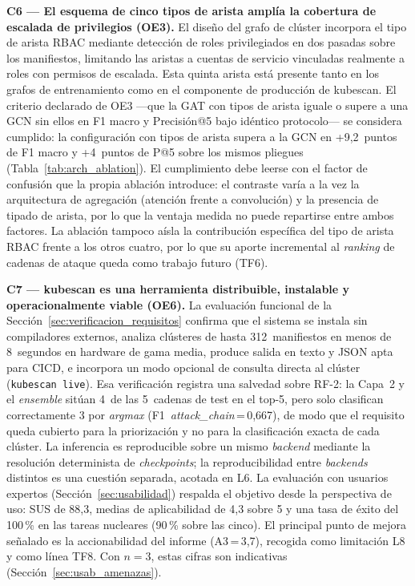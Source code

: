 \textbf{C6 — El esquema de cinco tipos de arista amplía la cobertura de escalada de
privilegios (OE3).} El diseño del grafo de clúster incorpora el tipo de arista
\ac{RBAC} mediante detección de roles privilegiados en dos pasadas sobre los
manifiestos, limitando las aristas a cuentas de servicio vinculadas realmente a
roles con permisos de escalada. Esta quinta arista está presente tanto en los
grafos de entrenamiento como en el componente de producción de kubescan.
El criterio declarado de OE3 —que la \ac{GAT} con tipos de arista iguale o supere a
una \ac{GCN} sin ellos en F1 macro y Precisión@5 bajo idéntico protocolo— se
considera cumplido: la configuración con tipos de arista supera a la \ac{GCN} en
+9,2~puntos de F1 macro y +4~puntos de P@5 sobre los mismos pliegues
(Tabla~\ref{tab:arch_ablation}). El cumplimiento debe leerse con el factor de confusión que
la propia ablación introduce: el contraste varía a la vez la arquitectura de
agregación (atención frente a convolución) y la presencia de tipado de arista, por
lo que la ventaja medida no puede repartirse entre ambos factores. La ablación
tampoco aísla la contribución específica del tipo de arista \ac{RBAC} frente a los
otros cuatro, por lo que su aporte incremental al \textit{ranking} de cadenas de ataque
queda como trabajo futuro (TF6).

\textbf{C7 — kubescan es una herramienta distribuible, instalable y operacionalmente
viable (OE6).} La evaluación funcional de la
Sección~\ref{sec:verificacion_requisitos} confirma que el sistema se instala sin
compiladores externos, analiza clústeres de hasta 312~manifiestos en menos de
8~segundos en hardware de gama media, produce salida en texto y \ac{JSON} apta para
\ac{CICD}, e incorpora un modo opcional de consulta directa al clúster
(\texttt{kubescan live}). Esa verificación registra una salvedad sobre RF-2: la
Capa~2 y el \textit{ensemble} sitúan 4~de las 5~cadenas de test en el top-5, pero
solo clasifican correctamente 3 por \textit{argmax}
(F1~\textit{attack\_chain}\,=\,0,667), de modo que el requisito queda cubierto para
la priorización y no para la clasificación exacta de cada clúster. La inferencia es
reproducible sobre un mismo \textit{backend} mediante la resolución determinista de
\textit{checkpoints}; la reproducibilidad entre \textit{backends} distintos es una
cuestión separada, acotada en L6. La evaluación con usuarios expertos
(Sección~\ref{sec:usabilidad}) respalda el objetivo desde la perspectiva de uso:
\acs{SUS} de 88,3, medias de aplicabilidad de 4,3 sobre 5 y una tasa de éxito del
100\,\% en las tareas nucleares (90\,\% sobre las cinco). El principal punto de
mejora señalado es la accionabilidad del informe (A3\,=\,3,7), recogida como
limitación L8 y como línea TF8. Con \(n=3\), estas cifras son indicativas
(Sección~\ref{sec:usab_amenazas}).

